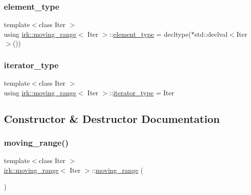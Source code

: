 \subsubsection{\texorpdfstring{element\+\_\+type}{element\_type}}
{\footnotesize\ttfamily template$<$class Iter $>$ \\
using \mbox{\hyperlink{structirk_1_1moving__range}{irk\+::moving\+\_\+range}}$<$ Iter $>$\+::\mbox{\hyperlink{structirk_1_1moving__range_a53b63b6f5e9e758aab935274c09355de}{element\+\_\+type}} =  decltype($\ast$std\+::declval$<$Iter$>$())}

\mbox{\label{structirk_1_1moving__range_ad77e99c581516edfaae4cdb3cc6793ba}} 
\subsubsection{\texorpdfstring{iterator\+\_\+type}{iterator\_type}}
{\footnotesize\ttfamily template$<$class Iter $>$ \\
using \mbox{\hyperlink{structirk_1_1moving__range}{irk\+::moving\+\_\+range}}$<$ Iter $>$\+::\mbox{\hyperlink{structirk_1_1moving__range_ad77e99c581516edfaae4cdb3cc6793ba}{iterator\+\_\+type}} =  Iter}



\subsection{Constructor \& Destructor Documentation}
\mbox{\label{structirk_1_1moving__range_a20e176576675bfd01b511fb250df1e5f}} 
\subsubsection{\texorpdfstring{moving\+\_\+range()}{moving\_range()}\hspace{0.1cm}{\footnotesize\ttfamily [1/2]}}
{\footnotesize\ttfamily template$<$class Iter $>$ \\
\mbox{\hyperlink{structirk_1_1moving__range}{irk\+::moving\+\_\+range}}$<$ Iter $>$\+::\mbox{\hyperlink{structirk_1_1moving__range}{moving\+\_\+range}} (\begin{DoxyParamCaption}{ }\end{DoxyParamCaption})\hspace{0.3cm}{\ttfamily [default]}}

